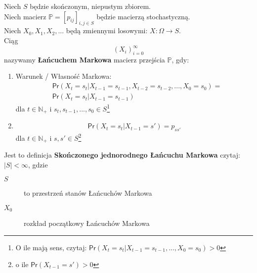 \begin{definition}
Niech $S$ będzie skończonym, niepustym zbiorem.\\
Niech macierz $\mathbb{P}=[p_{ij}]_{i,j\in S}$ będzie macierzą stochastyczną.\\
Niech $X_0, X_1, X_2,...$ będą zmiennymi losowymi: $X: \Omega \rightarrow S$.\\
Ciąg $$(X_i)_{i=0}^\infty$$ nazywamy \textbf{Łańcuchem Markowa} macierz przejścia $\mathbb{P}$, gdy:
\begin{enumerate}[label=\arabic*.]
\item Warunek / Własność Markowa:
\begin{align*}
&\mathsf{Pr}(X_t=s_t|X_{t-1}=s_{t-1},X_{t-2}=s_{t-2},...,X_0=s_0)=\\
&\mathsf{Pr}(X_t=s_t|X_{t-1}=s_{t-1})
\end{align*} dla $t\in \mathbb{N}_+$ i $s_t, s_{t-1},...,s_0\in S$\footnote{O ile mają sens, czytaj: $\mathsf{Pr}(X_t=s_t|X_{t-1}=s_{t-1},...,X_0=s_0)>0$}
\item $$\mathsf{Pr}(X_t=s_t|X_{t-1}=s')=p_{ss'}$$ dla $t\in \mathbb{N}_+$ i $s,s'\in S$\footnote{o ile $\mathsf{Pr}(X_{t-1}=s')>0$}
\end{enumerate}
Jest to definicja \textbf{Skończonego jednorodnego Łańcuchu Markowa} czytaj: $|S|<\infty$, gdzie 
\begin{description}
\item[$S$] to przestrzeń stanów Łańcuchów Markowa
\item[$X_0$] rozkład początkowy Łańcuchów Markowa
\end{description}
\end{definition}

